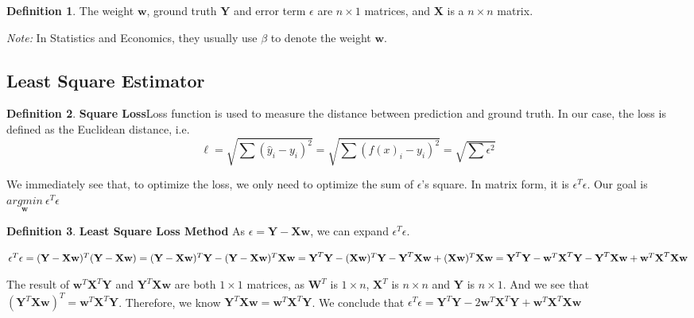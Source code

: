 \documentclass{article}
\theoremstyle{definition}
\newtheorem{defi}{Definition}[subsection]
\begin{document}
\begin{defi}
The weight $\textbf{w}$, ground truth $\textbf{Y}$ and error term $\epsilon$ are $n\times 1$ matrices, and $\textbf{X}$ is  a $n\times n$ matrix.

\textit{Note:} In Statistics and Economics, they usually use $\beta$ to denote the weight $\textbf{w}$.
\end{defi}

\subsection{Least Square Estimator}
\begin{defi}
\textbf{Square Loss}Loss function is used to measure the distance between prediction and ground truth. In our case, the loss is defined as the Euclidean distance, i.e. $$\ell=\sqrt{\sum{(\hat{y}_i-y_i)^{2}}}=\sqrt{\sum{(f(x)_i-y_i)^{2}}}=\sqrt{\sum{\epsilon^{2}}}$$

We immediately see that, to optimize the loss, we only need to optimize the sum of $\epsilon$'s square. In matrix form, it is $\epsilon^{T}\epsilon$. Our goal is $\underset{\textbf{w}}{argmin}\ \epsilon^{T}\epsilon$
\end{defi}

\begin{defi}
\textbf{Least Square Loss Method} As $\epsilon=\textbf{Y}-\textbf{X}\textbf{w}$, we can expand $\epsilon^{T}\epsilon$.

$\epsilon^{T}\epsilon=(\textbf{Y}-\textbf{X}\textbf{w})^{T}(\textbf{Y}-\textbf{X}\textbf{w}) \\
=(\textbf{Y}-\textbf{X}\textbf{w})^{T}\textbf{Y}-(\textbf{Y}-\textbf{X}\textbf{w})^{T}\textbf{X}\textbf{w} \\
=\textbf{Y}^{T}\textbf{Y}-(\textbf{X}\textbf{w})^{T}\textbf{Y}-\textbf{Y}^{T}\textbf{X}\textbf{w}+(\textbf{X}\textbf{w})^{T}\textbf{X}\textbf{w} \\
=\textbf{Y}^{T}\textbf{Y}-\textbf{w}^{T}\textbf{X}^{T}\textbf{Y}-\textbf{Y}^{T}\textbf{X}\textbf{w}+\textbf{w}^{T}\textbf{X}^{T}\textbf{X}\textbf{w}
$

The result of $\textbf{w}^{T}\textbf{X}^{T}\textbf{Y}$ and $\textbf{Y}^{T}\textbf{X}\textbf{w}$ are both $1\times 1$ matrices, as $\textbf{W}^{T}$ is $1\times n$, $\textbf{X}^{T}$ is $n\times n$ and $\textbf{Y}$ is $n\times 1$. And we see that $(\textbf{Y}^{T}\textbf{X}\textbf{w})^{T}=\textbf{w}^{T}\textbf{X}^{T}\textbf{Y}$. Therefore, we know $\textbf{Y}^{T}\textbf{X}\textbf{w}=\textbf{w}^{T}\textbf{X}^{T}\textbf{Y}$. We conclude that $\epsilon^{T}\epsilon=\textbf{Y}^{T}\textbf{Y}-2\textbf{w}^{T}\textbf{X}^{T}\textbf{Y}+\textbf{w}^{T}\textbf{X}^{T}\textbf{X}\textbf{w}$

\end{defi}
\end{document}
